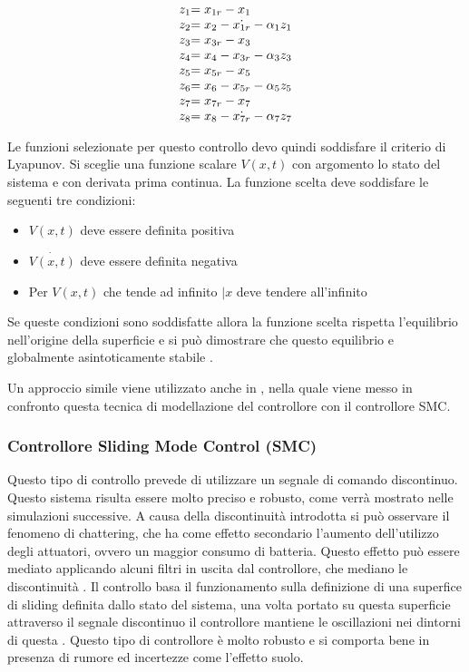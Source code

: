 \begin{equation}\label{eq:SistemaQuadrirotore-BACKERR}
	\begin{array}{r@{}l}
		z_1 & = x_{1r} -x_1 \\
		z_2 & = x_2 - \dot{x_{1r}} - \alpha_1 z_1 \\
		z_3 & = x_{3r} - x_3 \\
		z_4 & = x_4 - x_{3r} - \alpha_3 z_3 \\
		z_5 & = x_{5r} -x_5 \\
		z_6 & = x_6 - x_{5r} - \alpha_5 z_5 \\
		z_7 &= x_{7r} - x_7 \\
		z_8 &= x_8 - \dot{x_{7r}} - \alpha_7 z_7
	\end{array}
\end{equation}

Le funzioni selezionate per questo controllo devo quindi soddisfare il criterio di Lyapunov. Si sceglie una funzione scalare $V(x,t)$ con argomento lo stato del sistema e con derivata prima continua. La funzione scelta deve soddisfare le seguenti tre condizioni:
\begin{itemize}
	\item $V(x,t)$ deve essere definita positiva
	\item $\dot{V(x,t)}$ deve essere definita negativa
	\item Per $V(x,t)$ che tende ad infinito $\mid{x}$ deve tendere all'infinito
\end{itemize}
Se queste condizioni sono soddisfatte allora la funzione scelta rispetta l'equilibrio nell'origine della superficie e si può dimostrare che questo equilibrio e globalmente asintoticamente stabile \cite{DesTestCarm}.

Un approccio simile viene utilizzato anche in \cite{Backstepping1}, nella quale viene messo in confronto questa tecnica di modellazione del controllore con il controllore SMC.

\subsubsection{Controllore Sliding Mode Control (SMC)}

Questo tipo di controllo prevede di utilizzare un segnale di comando discontinuo. Questo sistema risulta essere molto preciso e robusto, come verrà mostrato nelle simulazioni successive. A causa della discontinuità introdotta si può  osservare il fenomeno di chattering, che ha come effetto secondario l'aumento dell'utilizzo degli attuatori, ovvero un maggior consumo di batteria. Questo effetto può essere mediato applicando alcuni filtri in uscita dal controllore, che mediano le discontinuità \cite{KimJinho2020ACSo}. Il controllo basa il funzionamento sulla definizione di una superfice di sliding definita dallo stato del sistema, una volta portato su questa superficie attraverso il segnale discontinuo il controllore mantiene le oscillazioni nei dintorni di questa \cite{DesTestCarm}. Questo tipo di controllore è molto robusto e si comporta bene in presenza di rumore ed incertezze come l'effetto suolo.

